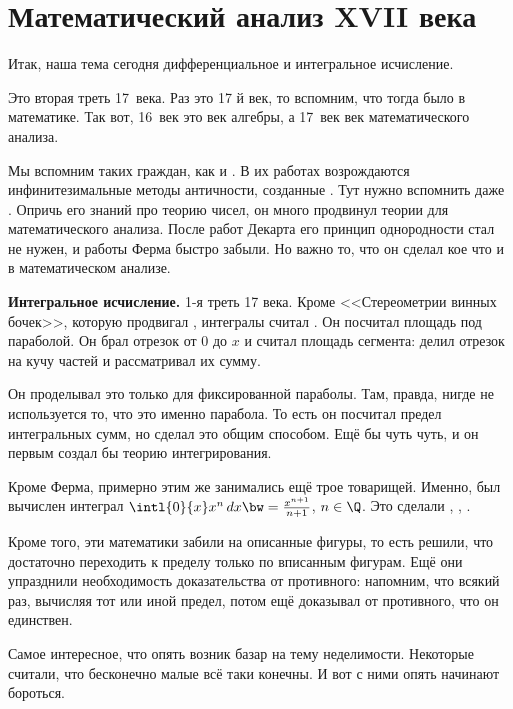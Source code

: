 \documentclass[a4paper,oneside,fleqn,10pt]{article}
\begin{document}

\section{Математический анализ XVII века}

Итак, наша тема сегодня дифференциальное и интегральное исчисление.

Это вторая треть 17~века. Раз это 17 й век, то вспомним, что тогда
было в математике.  Так вот, 16~век это век алгебры, а 17~век век
математического анализа.

Мы вспомним таких граждан, как  и
.  В их работах возрождаются инфинитезимальные
методы античности, созданные . Тут нужно
вспомнить даже . Опричь его знаний про
теорию чисел, он много продвинул теории для математического анализа.
После работ Декарта его принцип однородности стал не нужен, и работы
Ферма быстро забыли.  Но важно то, что он сделал кое что и в
математическом анализе.

\textbf{Интегральное исчисление.} 1-я треть 17 века. Кроме
<<Стереометрии винных бочек>>, которую продвигал ,
интегралы считал .  Он посчитал площадь под параболой. Он
брал отрезок от 0 до $x$ и считал площадь сегмента: делил отрезок на
кучу частей и рассматривал их сумму.

Он проделывал это только для фиксированной параболы. Там, правда,
нигде не используется то, что это именно парабола. То есть он посчитал
предел интегральных сумм, но сделал это общим способом. Ещё бы чуть
чуть, и он первым создал бы теорию интегрирования.

Кроме Ферма, примерно этим же занимались ещё трое товарищей.  Именно,
был вычислен интеграл $\intl{0}{x}x^n\,dx \bw= \frac{x^{n+1}}{n+1}$,
$n \in \Q$.  Это сделали , , .

Кроме того, эти математики забили на описанные фигуры, то есть решили,
что достаточно переходить к пределу только по вписанным фигурам. Ещё
они упразднили необходимость доказательства от противного: напомним,
что  всякий раз, вычисляя тот или иной предел, потом ещё
доказывал от противного, что он единствен.

Самое интересное, что опять возник базар на тему неделимости.
Некоторые считали, что бесконечно малые всё таки конечны.  И вот с
ними опять начинают бороться.
\end{document}
